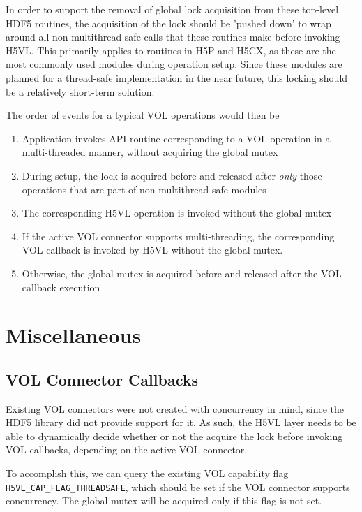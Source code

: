 \documentclass{article}
\begin{document}
In order to support the removal of global lock acquisition from these top-level HDF5 routines, the acquisition of the lock should be 'pushed down' to wrap around all non-multithread-safe calls that these routines make before invoking H5VL. This primarily applies to routines in H5P and H5CX, as these are the most commonly used modules during operation setup. Since these modules are planned for a thread-safe implementation in the near future, this locking should be a relatively short-term solution. 

The order of events for a typical VOL operations would then be

\begin{enumerate}
\item Application invokes API routine corresponding to a VOL operation in a multi-threaded manner, without acquiring the global mutex
\item During setup, the lock is acquired before and released after \textit{only} those operations that are part of non-multithread-safe modules
\item The corresponding H5VL operation is invoked without the global mutex
\item If the active VOL connector supports multi-threading, the corresponding VOL callback is invoked by H5VL without the global mutex.
\item Otherwise, the global mutex is acquired before and released after the VOL callback execution

\end{enumerate}

\section{Miscellaneous}

\subsection{VOL Connector Callbacks}

Existing VOL connectors were not created with concurrency in mind, since the HDF5 library did not provide support for it. As such, the H5VL layer needs to be able to dynamically decide whether or not the acquire the lock before invoking VOL callbacks, depending on the active VOL connector.

To accomplish this, we can query the existing VOL capability flag \texttt{H5VL\_CAP\_FLAG\_THREADSAFE}, which should be set if the VOL connector supports concurrency. The global mutex will be acquired only if this flag is not set.
\end{document}
